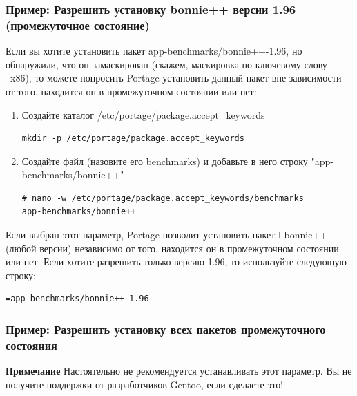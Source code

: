 \documentclass[10pt]{book}
\begin{document}
\subsubsection{Пример: Разрешить установку bonnie++ версии 1.96 (промежуточное состояние)}
Если вы хотите установить пакет app-benchmarks/bonnie++-1.96, но обнаружили, что он замаскирован (скажем, маскировка по ключевому слову ~x86), то можете попросить Portage установить данный пакет вне зависимости от того, находится он в промежуточном состоянии или нет:
\begin{enumerate}
 \item Создайте каталог /etc/portage/package.accept\_keywords
  \begin{tcolorbox}
\begin{lstlisting}
mkdir -p /etc/portage/package.accept_keywords
\end{lstlisting}
\end{tcolorbox}
 \item Создайте файл (назовите его benchmarks) и добавьте в него строку "app-benchmarks/bonnie++"
  \begin{tcolorbox}
\begin{lstlisting}
# nano -w /etc/portage/package.accept_keywords/benchmarks
app-benchmarks/bonnie++
\end{lstlisting}
\end{tcolorbox}
\end{enumerate}
Если выбран этот параметр, Portage позволит установить пакет l bonnie++ (любой версии) независимо от того, находится он в промежуточном состоянии или нет.
Если хотите разрешить только версию 1.96, то используйте следующую строку:
  \begin{tcolorbox}
\begin{lstlisting}
=app-benchmarks/bonnie++-1.96
\end{lstlisting}
\end{tcolorbox}

\subsubsection{Пример: Разрешить установку всех пакетов промежуточного состояния}
\textbf{Примечание} 
Настоятельно не рекомендуется устанавливать этот параметр. Вы не получите поддержки от разработчиков Gentoo, если сделаете это!
\end{document}
